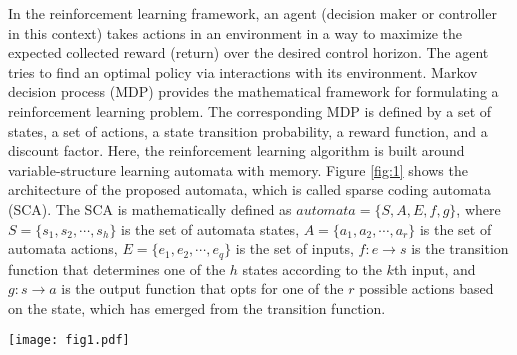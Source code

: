 \documentclass[journal]{IEEEtran}
\begin{document}
In the reinforcement learning framework, an agent (decision maker or controller in this context) takes actions in an environment in a way to maximize the expected collected reward (return) over the desired control horizon. The agent tries to find an optimal policy via interactions with its environment. Markov decision process (MDP) provides the mathematical framework for formulating a reinforcement learning problem. The corresponding MDP is defined by a set of states, a set of actions, a state transition probability, a reward function, and a discount factor. Here, the reinforcement learning algorithm is built around  variable-structure learning automata with memory. Figure \ref{fig:1} shows the architecture of the proposed automata, which is called sparse coding automata (SCA). The SCA is mathematically defined as $automata = \{S, A, E, f, g\}$, where $S=\{s_1,s_2,\cdots,s_h\}$ is the set of automata states, 	$A=\{a_1,a_2,\cdots,a_r\}$ is the set of automata actions, $E=\{e_1,e_2,\cdots,e_q\}$ is the set of inputs, $f: e \rightarrow s$ is the transition function that determines one of the $h$ states according to the $k$th input, and $g: s \rightarrow a$ is the output function that opts for one of the $r$ possible actions based on the state, which has emerged from the transition function. 

%
\begin{figure*}[]
\centering
\texttt{[image: fig1.pdf]}
\caption{Architecture of the proposed automata, where $s_i$ and $a_i$ refer to states and actions, respectively, $s_i^{lb}$ and $s_i^{ub}$denote the lower and the upper bounds on the reconstruction error, and $s_i^{m}$ refers to memory.}
\label{fig:1}
\end{figure*}
%
\end{document}
